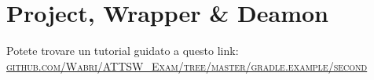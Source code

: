 \section{Project, Wrapper \& Deamon}
Potete trovare un tutorial guidato a questo link: \href{https://github.com/Wabri/ATTSW_Exam/tree/master/gradle.example/second}{\textsc{github.com/Wabri/ATTSW\_Exam/tree/master/gradle.example/second}}





